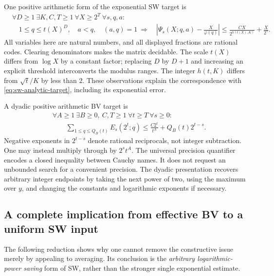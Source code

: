One positive arithmetic form of the exponential SW target is
\begin{equation}
\begin{split}
 &\forall D\geq1\ \exists K,C,T\geq1\ \forall X\geq2^T
       \ \forall s,q,a:\\[-2pt]
 &\quad
 1\leq q\leq t(X)^D,\quad a<q,\quad(a,q)=1
 \ \Longrightarrow\quad
 \left|\Psi_s(X;q,a)-\frac{X}{\varphi(q)}\right|
 \leq \frac{CX}{2^{h(t(X),K)}}+\frac{X}{2^s}.
\end{split}
\label{eq:sw-arithmetic-target}
\end{equation}
All variables here are natural numbers, and all displayed fractions are
rational codes. Clearing denominators makes the matrix decidable.
The scale $t(X)$ differs from $\log X$ by a constant factor; replacing
$D$ by $D+1$ and increasing an explicit threshold interconverts the
modulus ranges. The integer $h(t,K)$ differs from $\sqrt t/K$ by less
than $2$. These observations explain the correspondence with
\eqref{eq:sw-analytic-target}, including its exponential error.

A dyadic positive arithmetic BV target is
\begin{equation}
\begin{split}
 &\forall A\geq1\ \exists B\geq0,\ C,T\geq1
       \ \forall t\geq T\ \forall s\geq0:\\
 &\qquad
 \sum_{1\leq q\leq Q_B(t)}E_s(2^t;q)
 \leq \frac{C2^t}{t^A}+Q_B(t)2^{t-s}.
\end{split}
\label{eq:bv-arithmetic-target}
\end{equation}
Negative exponents in $2^{t-s}$ denote rational reciprocals, not integer
subtraction. One may instead multiply through by $2^s t^A$.
The universal precision quantifier encodes a closed inequality between
Cauchy names. It does not request an unbounded search for a convenient
precision. The dyadic presentation recovers arbitrary integer endpoints
by taking the next power of two, using the maximum over $y$, and changing
the constants and logarithmic exponents if necessary.

\subsection{A complete implication from effective BV to a uniform SW input}

The following reduction shows why one cannot remove the constructive
issue merely by appealing to averaging. Its conclusion is the
\emph{arbitrary logarithmic-power saving} form of SW, rather than the
stronger single exponential estimate.


